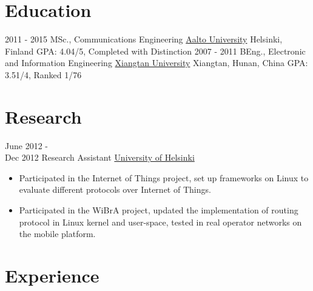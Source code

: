 \documentclass[letterpaper]{twentysecondcv} %
\begin{document}
\makeprofile %

\section{Education}

\begin{twenty} %
	\twentyitem
    	{2011 - 2015}
        {MSc., Communications Engineering}
        {\href{http://www.aalto.fi/en/}{Aalto University}}
        {Helsinki, Finland}
        {GPA: 4.04/5, Completed with Distinction}
	\twentyitem
    	{2007 - 2011}
        {BEng.,  Electronic and Information Engineering}
        {\href{http://www.xtu.edu.cn/english/}{Xiangtan University}}
        {Xiangtan, Hunan, China}
        {GPA: 3.51/4, Ranked 1/76}
\end{twenty}


\section{Research}
\begin{twenty}
	\twentyitem
    	{June 2012 - \\Dec 2012}
        {Research Assistant}
        {\href{https://www.helsinki.fi/en}{University of Helsinki}}
        {}
        {
        {\begin{itemize}
        \item Participated in the Internet of Things project, set up	 frameworks on Linux to evaluate different protocols over Internet of Things.
        \item Participated in the WiBrA project,	 updated	 the	 implementation of routing protocol in Linux kernel and	 user-space, tested in real operator networks on the mobile platform.
    \end{itemize}}
        }
\end{twenty}


\section{Experience}
\end{document}
